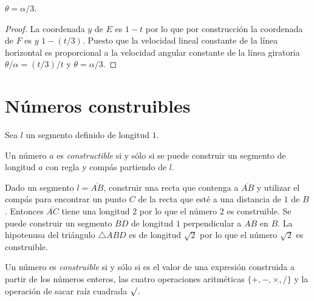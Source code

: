\begin{theorem}
$\theta = \alpha/3$.
\end{theorem}
\begin{proof}
La coordenada $y$ de $E$ es $1-t$ por lo que por construcción la coordenada de $F$ es $y$ $1-(t/3)$. Puesto que la velocidad lineal constante de la línea horizontal es proporcional a la velocidad angular constante de la línea giratoria $\theta/\alpha = (t/3)/t$ y $\theta = \alpha/3$.
\end{proof}


\section{Números construibles}\label{s.trisect-constructible}

Sea $l$ un segmento definido de longitud $1$.
\begin{definition}
Un número $a$ es \emph{constructible} si y sólo si se puede construir un segmento de longitud $a$ con regla y compás partiendo de $l$.
\end{definition}

Dado un segmento $l=\overline{AB}$, construir una recta que contenga a $\overline{AB}$ y utilizar el compás para encontrar un punto $C$ de la recta que esté a una distancia de $1$ de $B$. Entonces $\overline{AC}$ tiene una longitud $2$ por lo que el número $2$ es construible. Se puede construir un segmento $\overline{BD}$ de longitud $1$ perpendicular a $\overline{AB}$ en $B$. La hipotenusa del triángulo $\triangle ABD$ es de longitud $\sqrt{2}$ por lo que el número $\sqrt{2}$ es construible.

\begin{theorem}\label{thm.trisect-constructible}
Un número es \emph{construible} si y sólo si es el valor de una expresión construida a partir de los números enteros, las cuatro operaciones aritméticas $\{+,-,\times,/\}$ y la operación de sacar raíz cuadrada $\surd$.
\end{theorem}

